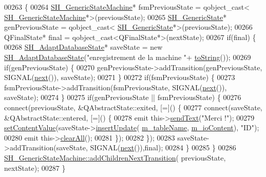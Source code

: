 \begin{DoxyCode}
00263 \{
00264     \hyperlink{classSH__GenericStateMachine}{SH\_GenericStateMachine}* fsmPreviousState = qobject\_cast<
      \hyperlink{classSH__GenericStateMachine}{SH\_GenericStateMachine}*>(previousState);
00265     \hyperlink{classSH__GenericState}{SH\_GenericState}* genPreviousState = qobject\_cast<
      \hyperlink{classSH__GenericState}{SH\_GenericState}*>(previousState);
00266     QFinalState* \textcolor{keyword}{final} = qobject\_cast<QFinalState*>(nextState);
00267     \textcolor{keywordflow}{if}(\textcolor{keyword}{final}) \{
00268         \hyperlink{classSH__AdaptDatabaseState}{SH\_AdaptDatabaseState}* saveState = \textcolor{keyword}{new} 
      \hyperlink{classSH__AdaptDatabaseState}{SH\_AdaptDatabaseState}(\textcolor{stringliteral}{"enregistrement de la machine "}+
      \hyperlink{classSH__GenericStateMachine_a85c0c1c9d258ae991f84667412fa47cd}{toString}());
00269         \textcolor{keywordflow}{if}(genPreviousState) \{
00270             genPreviousState->addTransition(genPreviousState, SIGNAL(\hyperlink{classSH__GenericStateMachine_af4771d31d87951c997fba1633c2d67f6}{next}()), saveState);
00271         \}
00272         \textcolor{keywordflow}{if}(fsmPreviousState) \{
00273             fsmPreviousState->addTransition(fsmPreviousState, SIGNAL(\hyperlink{classSH__GenericStateMachine_af4771d31d87951c997fba1633c2d67f6}{next}()), saveState);
00274         \}
00275         \textcolor{keywordflow}{if}(genPreviousState || fsmPreviousState) \{
00276             connect(previousState, &QAbstractState::exited, [=]() \{
00277                 connect(saveState, &QAbstractState::entered, [=]() \{
00278                     emit this->\hyperlink{classSH__InOutStateMachine_a5e7f5958bae31696b6a8deab94ad2b4f}{sendText}(\textcolor{stringliteral}{"Merci !"});
00279                     \hyperlink{classSH__InOutStateMachine_a9ab1534306b2bdb62743d4bcefe40c17}{setContentValue}(saveState->\hyperlink{classSH__AdaptDatabaseState_a037db544ea05f42d21fcbdda758839fe}{insertUpdate}(
      \hyperlink{classSH__InOutStateMachine_aa009eecc5ab6181358faafb5996b6006}{m\_tableName}, \hyperlink{classSH__InOutStateMachine_a8cfbc27eef057bf37b7711bdfef2077e}{m\_ioContent}), \textcolor{stringliteral}{"ID"});
00280                     emit this->\hyperlink{classSH__InOutStateMachine_aa1d5860888c96ff94c55dc77e0fdfdcf}{clearAll}();
00281                 \});
00282             \});
00283             saveState->addTransition(saveState, SIGNAL(\hyperlink{classSH__GenericStateMachine_af4771d31d87951c997fba1633c2d67f6}{next}()),\textcolor{keyword}{final});
00284         \}
00285     \}
00286     \hyperlink{classSH__GenericStateMachine_a16d844020bc26480bd81d6b794c8364c}{SH\_GenericStateMachine::addChildrenNextTransition}(
      previousState, nextState);
00287 \}
\end{DoxyCode}


